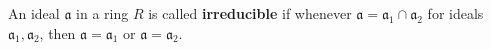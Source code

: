 An ideal $\mathfrak{a}$ in a ring $R$ is called \textbf{irreducible} if whenever $\mathfrak{a} = \mathfrak{a}_1 \cap \mathfrak{a}_2$ for ideals $\mathfrak{a}_1, \mathfrak{a}_2$, then $\mathfrak{a} = \mathfrak{a}_1$ or $\mathfrak{a} = \mathfrak{a}_2$.
